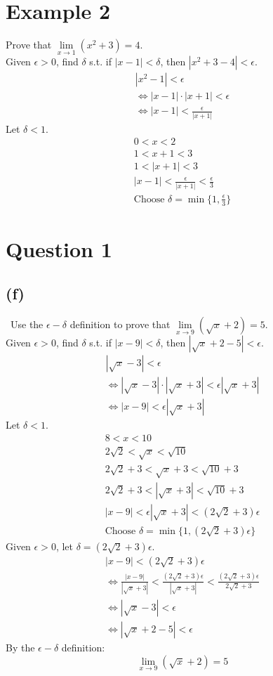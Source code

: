 \documentclass[12pt]{article}
\begin{document}
\section{Example 2}
Prove that $\lim\limits_{x \to 1} (x^2+3)=4$.\\
Given $\epsilon > 0$, find $\delta$ s.t. if $|x-1|< \delta$, then $|x^2+3-4|<\epsilon$.
\begin{gather*}
    |x^2-1|<\epsilon \\
    \iff |x-1| \cdot |x+1| < \epsilon \\
    \iff |x-1|<\frac{\epsilon}{|x+1|}
\end{gather*}
Let $\delta < 1$.
\begin{gather*}
    0<x<2\\
    1<x+1<3\\
    1<|x+1|<3\\
    |x-1|<\frac{\epsilon}{|x+1|}<\frac{\epsilon}{3}\\
    \boxed{\text{Choose } \delta= \min\{1, \frac{\epsilon}{3}\}}
\end{gather*}

\section{Question 1}
\subsection{(f)} \, Use the $\epsilon - \delta$ definition to prove that $\lim\limits_{x\to9}(\sqrt{x}+2)=5$.\\
Given $\epsilon > 0$, find $\delta$ s.t. if $|x-9|<\delta$, then $|\sqrt{x}+2-5|<\epsilon$.
\begin{gather*}
    |\sqrt{x}-3|<\epsilon\\
    \iff |\sqrt{x}-3|\cdot|\sqrt{x}+3|<\epsilon|\sqrt{x}+3|\\
    \iff |x-9|<\epsilon|\sqrt{x}+3|
\end{gather*}
Let $\delta<1$.
\begin{gather*}
    8<x<10\\
    2\sqrt{2}<\sqrt{x}<\sqrt{10}\\
    2\sqrt{2}+3<\sqrt{x}+3<\sqrt{10}+3\\
    2\sqrt{2}+3<|\sqrt{x}+3|<\sqrt{10}+3\\
    |x-9|<\epsilon|\sqrt{x}+3|<(2\sqrt{2}+3)\epsilon\\
    \boxed{\text{Choose } \delta=\min\{1,(2\sqrt{2}+3)\epsilon\}}
\end{gather*}
Given $\epsilon > 0$, let $\delta=(2\sqrt{2}+3)\epsilon$.
\begin{gather*}
    |x-9|<(2\sqrt{2}+3)\epsilon\\
    \iff \frac{|x-9|}{|\sqrt{x}+3|}<\frac{(2\sqrt{2}+3)\epsilon}{|\sqrt{x}+3|}<\frac{(2\sqrt{2}+3)\epsilon}{2\sqrt{2}+3}\\
    \iff |\sqrt{x}-3|<\epsilon\\
    \iff |\sqrt{x}+2-5|<\epsilon
\end{gather*}
By the $\epsilon-\delta$ definition:
\[
\boxed{\lim\limits_{x\to9}(\sqrt{x}+2)=5}
\]
\end{document}
